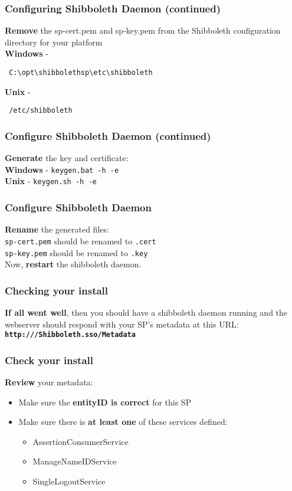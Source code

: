 \begin{frame}[fragile]
\frametitle{Configuring Shibboleth Daemon (continued)}
\textbf{Remove} the sp-cert.pem and sp-key.pem from the Shibboleth configuration directory for your platform \\ \bigskip
\textbf{Windows} - \begin{verbatim} C:\opt\shibbolethsp\etc\shibboleth \end{verbatim}
\textbf{Unix} - \begin{verbatim} /etc/shibboleth \end{verbatim}
\end{frame}

\begin{frame}[fragile]
\frametitle{Configure Shibboleth Daemon (continued)}
\textbf{Generate} the key and certificate: \\ \bigskip
\textbf{Windows} - \texttt{keygen.bat -h  -e } \\
\bigskip
\textbf{Unix} - \texttt{keygen.sh -h  -e } \\
\end{frame}

\begin{frame}
\frametitle{Configure Shibboleth Daemon}
\textbf{Rename} the generated files: \\ \bigskip
\texttt{sp-cert.pem} should be renamed to \texttt{.cert} \\
\bigskip
\texttt{sp-key.pem} should be renamed to \texttt{.key} \\
\bigskip
Now, \textbf{restart} the shibboleth daemon.
\end{frame}

\begin{frame}
\frametitle{Checking your install}
\textbf{If all went well}, then you should have a shibboleth daemon running 
and the webserver should respond with your SP's metadata at this URL: \\ \bigskip
\textbf{\texttt{http:///Shibboleth.sso/Metadata}}
\end{frame}

\begin{frame}
\frametitle{Check your install}
\textbf{Review} your metadata:
\begin{itemize}
\item Make sure the \textbf{entityID is correct} for this SP
\item Make sure there is \textbf{at least one} of these services defined:
\begin{itemize}
\item AssertionConsumerService
\item ManageNameIDService
\item SingleLogoutService
\end{itemize}
\end{itemize}
\end{frame}

